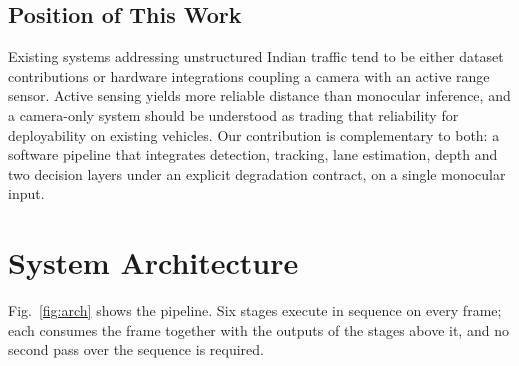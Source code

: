 \documentclass[conference]{IEEEtran}
\begin{document}
\subsection{Position of This Work}

Existing systems addressing unstructured Indian traffic tend to be either dataset
contributions \cite{varma2019idd,kumar2025driveindia,iisc2025uvh26} or hardware
integrations coupling a camera with an active range sensor. Active sensing
yields more reliable distance than monocular inference, and a camera-only system
should be understood as trading that reliability for deployability on existing
vehicles. Our contribution is complementary to both: a software pipeline that
integrates detection, tracking, lane estimation, depth and two decision layers
under an explicit degradation contract, on a single monocular input.

\section{System Architecture}

Fig.~\ref{fig:arch} shows the pipeline. Six stages execute in sequence on every
frame; each consumes the frame together with the outputs of the stages above it,
and no second pass over the sequence is required.
\end{document}
